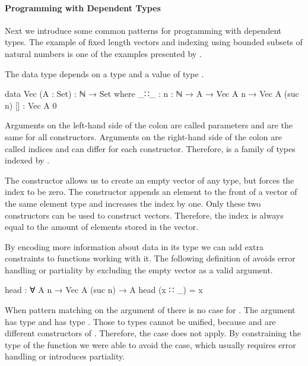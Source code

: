 \paragraph{Programming with Dependent Types}

Next we introduce some common patterns for programming with dependent types.
The example of fixed length vectors and indexing using bounded subsets of
natural numbers is one of the examples presented by
\textcite{DBLP:conf/afp/Norell08}.

The data type  depends on a type  and a value
of type .

\begin{code}
data Vec (A : Set) : ℕ → Set where
  _∷_  : {n : ℕ} → A → Vec A n → Vec A (suc n)
  []   : Vec A 0
\end{code}
Arguments on the left-hand side of the colon are called parameters and are the
same for all constructors.
Arguments on the right-hand side of the colon are called indices and can differ
for each constructor.
Therefore, \AgdaSpace{} is a family of types
indexed by .

The \AgdaInductiveConstructor{[]} constructor allows us to create an empty
vector of any type, but forces the index to be zero.
The  constructor appends an element to the front
of a vector of the same element type and increases the index by one.
Only these two constructors can be used to construct vectors.
Therefore, the index is always equal to the amount of elements stored in the
vector.

By encoding more information about data in its type we can add extra constraints
to functions working with it.
The following definition of  avoids error handling or
partiality by excluding the empty vector as a valid argument.

\begin{code}
head : ∀ {A n} → Vec A (suc n) → A
head (x ∷ _) = x
\end{code}
When pattern matching on the argument of  there is no case
for \AgdaInductiveConstructor{[]}.
The argument has type  and
\AgdaInductiveConstructor{[]} has type .
Those to types cannot be unified, because  and
 are different constructors of .
Therefore, the \AgdaInductiveConstructor{[]} case does not apply.
By constraining the type of the function we were able to avoid the case, which
usually requires error handling or introduces partiality.

